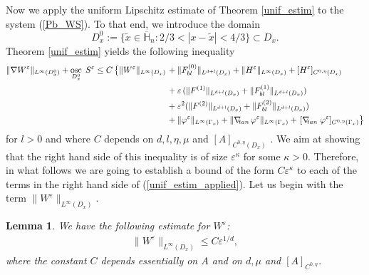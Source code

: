 \documentclass[11pt, reqno]{amsart}
\newtheorem{lemma}[theorem]{Lemma}
\theoremstyle{definition}
\theoremstyle{remark}
\numberwithin{equation}{section}
\DeclareMathOperator*{\osc}{osc}
\begin{document}
	\noindent 	Now we apply the uniform Lipschitz estimate of Theorem \ref{unif_estim} to the  system (\ref{Pb_WS}). To that end, we introduce the domain  $$D^0_x:= \{ \tilde{x}\in\overline{\mathbb{H}}_n : 2/3<  |x-\tilde{x}|<4/3 \} \subset D_x.$$
	\noindent Theorem  \ref{unif_estim}  yields the following inequality
	\begin{align}
		\|\nabla W^{\varepsilon}\|_{L^\infty(D_x^0)} + \osc_{D_x^0}  \;    S^{\varepsilon}
		\leq   C  \left\{ \|W^{\varepsilon} \|_{L^\infty(D_x)} \right. &+ \| F^{(0)}_{bl} \|_{L^{d+l}(D_x)}+     \| H^\varepsilon \|_{L^\infty(D_x)} +  [H^\varepsilon]_{C^{0,\eta}(D_x)} \nonumber \\
		&+ \varepsilon  \,(\| F^{(1)} \|_{L^{d+l}(D_x)}+ \| F^{(1)}_{bl} \|_{L^{d+l}(D_x)} )\label{unif_estim_applied}\\
		&+\varepsilon^2 (\| F^{(2)} \|_{L^{d+l}(D_x)}+ \| F^{(2)}_{bl} \|_{L^{d+l}(D_x)} )\nonumber\\ 
		&+\| \varphi^\varepsilon \|_{L^\infty(\Gamma_x)} + \| \nabla_{\!\!\textup{ tan}} \, \varphi^\varepsilon \|_{L^\infty(\Gamma_x)} + \left.  [\nabla_{\!\!\textup{ tan}}\; \varphi^\varepsilon]_{C^{0,\eta}(\Gamma_x)} \right\}\nonumber \nonumber
	\end{align} for $l>0$ and 	where $C$ depends on $d, l, \eta, \mu$ and $[A]_{C^{0,\eta}(D_x)}$ .
	We aim at showing that the right hand side of this inequality is of size $\varepsilon^\kappa$ for some $\kappa>0$. Therefore, in what follows we are going to establish a bound of the form $C \varepsilon^\kappa$ to each of the terms  in the right hand  side of (\ref{unif_estim_applied}). Let us begin with the term $	\| W^{\varepsilon}\|_{L^\infty(D_x)}$.
	\begin{lemma}
		We have the following estimate for $W^\varepsilon$:
		\begin{align*}
			\| W^{\varepsilon}\|_{L^\infty(D_x)}	 \leq   C  \varepsilon^{1/d}, 
		\end{align*}where the constant $C$ depends essentially on $A$ and on $d, \mu$ and $[A]_{C^{0,\eta}}$.
	\end{lemma}
\end{document}
